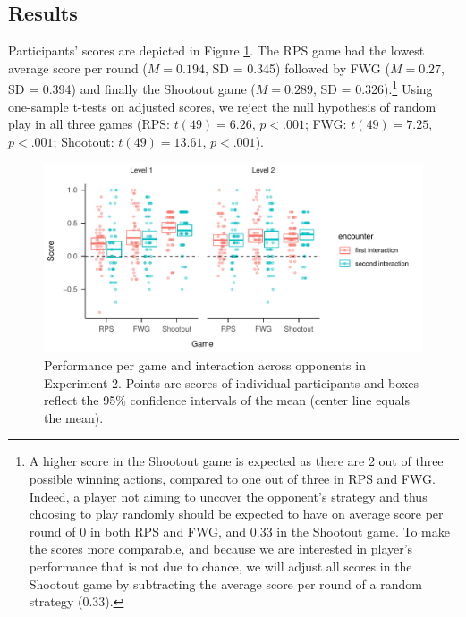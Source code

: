 \documentclass[man,floatsintext]{apa6}
\begin{document}
\hypertarget{results-1}{%
\subsection{Results}\label{results-1}}

Participants' scores are depicted in Figure \ref{fig:exp2-score-by-opp}. The RPS game had the lowest average score per round (\(M = 0.194\), SD = 0.345) followed by FWG (\(M = 0.27\), SD = 0.394) and finally the Shootout game (\(M = 0.289\), SD = 0.326).\footnote{A higher score in the Shootout game is expected as there are 2 out of three possible winning actions, compared to one out of three in RPS and FWG. Indeed, a player not aiming to uncover the opponent's strategy and thus choosing to play randomly should be expected to have on average score per round of 0 in both RPS and FWG, and 0.33 in the Shootout game. To make the scores more comparable, and because we are interested in player's performance that is not due to chance, we will adjust all scores in the Shootout game by subtracting the average score per round of a random strategy (0.33).} Using one-sample t-tests on adjusted scores, we reject the null hypothesis of random play in all three games (RPS: \(t(49) = 6.26\), \(p < .001\); FWG: \(t(49) = 7.25\), \(p < .001\); Shootout: \(t(49) = 13.61\), \(p < .001\)).

\begin{figure}

{\centering \includegraphics{paper_draft_2021_files/figure-latex/exp2-score-by-opp-1} 

}

\caption{\label{fig:exp2-score-by-opp}Performance per game and interaction across opponents in Experiment 2. Points are scores of individual participants and boxes reflect the 95\% confidence intervals of the mean (center line equals the mean).}\label{fig:exp2-score-by-opp}
\end{figure}
\end{document}
